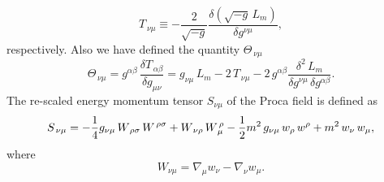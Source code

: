 \begin{equation}
\label{11}
T_{\,\nu\mu}\equiv-\frac{2}{\sqrt{-g}}\frac{\delta(\sqrt{-g}\,L_m)}{\delta g^{\nu\mu}},
\end{equation} 
respectively. Also we have defined the quantity $\Theta_{\,\nu\mu}$
\begin{equation}
\label{12}
\Theta_{\,\nu\mu}=g^{\alpha\beta}\,\frac{\delta T_{\,\alpha\beta}}{\delta g_{\mu\nu}}=g_{\nu\mu}\,L_m-2\,T_{\,\nu\mu}-2\,g^{\alpha\beta}\frac{\delta^2 \,L_m}{\delta g^{\nu\mu}\,\delta g^{\alpha\beta}}.
\end{equation}
The re-scaled energy momentum tensor $S_{\nu\mu}$ of the Proca field is defined as
\begin{equation}
\label{13}
S_{\,\nu\mu}=-\frac{1}{4}g_{\nu\mu}\,W_{\,\rho\sigma}\,W^{\,\rho\sigma}+W_{\,\nu\rho}\,W^{\,\rho}_{\,\mu} -\frac{1}{2}m^2\,g_{\nu\mu}\,w_\rho \,w^\rho \\
+m^2\, w_\nu\, w_\mu,
\end{equation}
where 
\begin{equation}
\label{14}
W_{\nu\mu}=\nabla_\mu w_\nu-\nabla_\nu  w_\mu.
\end{equation}


